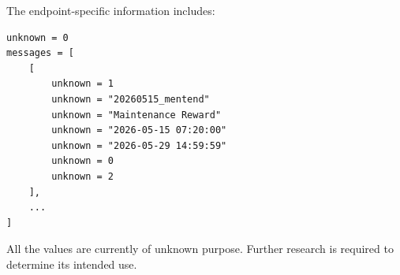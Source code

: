 The endpoint-specific information includes:

\begin{lstlisting}
unknown = 0
messages = [
    [
        unknown = 1
        unknown = "20260515_mentend"
        unknown = "Maintenance Reward"
        unknown = "2026-05-15 07:20:00"
        unknown = "2026-05-29 14:59:59"
        unknown = 0
        unknown = 2
    ],
    ...
]
\end{lstlisting}

\begin{tcolorbox}[colback=yellow!10,colframe=orange!80!black,title=Warning]
All the values are currently of unknown purpose.
Further research is required to determine its intended use.
\end{tcolorbox}

\newpage